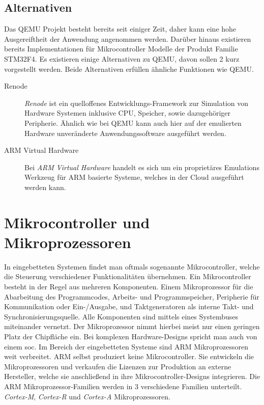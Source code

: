 
\subsection{Alternativen}

Das QEMU Projekt besteht bereits seit einiger Zeit, daher kann eine hohe
Ausgereiftheit der Anwendung angenommen werden.
Darüber hinaus existieren bereits Implementationen für Mikrocontroller Modelle
der Produkt Familie STM32F4.
Es existieren einige Alternativen zu QEMU, davon sollen 2 kurz vorgestellt
werden.
Beide Alternativen erfüllen ähnliche Funktionen wie QEMU.
\begin{description}
    \item[Renode]
    \textit{Renode} ist ein quelloffenes Entwicklungs-Framework zur Simulation
    von Hardware Systemen inklusive CPU, Speicher, sowie dazugehöriger
    Peripherie\cite{RenodeAbout}.
    Ähnlich wie bei QEMU kann auch hier auf der emulierten Hardware
    unveränderte Anwendungssoftware ausgeführt werden.
    \item[ARM Virtual Hardware]
    Bei \textit{ARM Virtual Hardware} handelt es sich um ein proprietäres
    Emulations Werkzeug für ARM basierte Systeme, welches in der Cloud
        ausgeführt werden kann\cite{ArmVirtualHwAbout}.
\end{description}


\section{Mikrocontroller und Mikroprozessoren}

In eingebetteten Systemen findet man oftmals sogenannte Mikrocontroller, welche
die Steuerung verschiedener Funktionalitäten übernehmen.
Ein Mikrocontroller besteht in der Regel aus mehreren Komponenten.
Einem Mikroprozessor für die Abarbeitung des Programmcodes, Arbeits- und
Programmspeicher, Peripherie für Kommunikation oder Ein-/Ausgabe, und
Taktgeneratoren als interne Takt- und Synchronisierungsquelle.
Alle Komponenten sind mittels eines Systembuses miteinander
vernetzt\cite{DefGuideCM34_JYiu}.
Der Mikroprozessor nimmt hierbei meist nur einen geringen Platz der Chipfläche
ein.
Bei komplexen Hardware-Designs spricht man auch von einem \ac{soc}.
\newline %
Im Bereich der eingebetteten Systeme sind ARM Mikroprozessoren weit verbreitet.
ARM selbst produziert keine Mikrocontroller.
Sie entwickeln die Mikroprozessoren und verkaufen die Lizenzen zur Produktion
an externe Hersteller, welche sie anschließend in ihre Mikrocontroller-Designs
integrieren.
\newline
Die ARM Mikroprozessor-Familien werden in 3 verschiedene Familien unterteilt.
\textit{Cortex-M}, \textit{Cortex-R} und \textit{Cortex-A} Mikroprozessoren.

